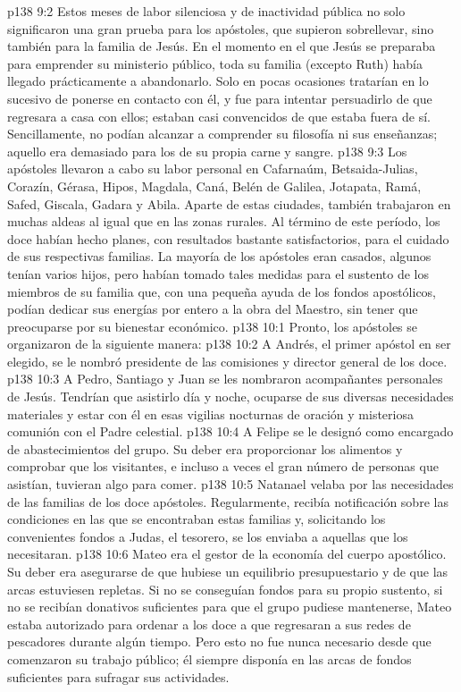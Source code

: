 \vs p138 9:2 Estos meses de labor silenciosa y de inactividad pública no solo significaron una gran prueba para los apóstoles, que supieron sobrellevar, sino también para la familia de Jesús. En el momento en el que Jesús se preparaba para emprender su ministerio público, toda su familia (excepto Ruth) había llegado prácticamente a abandonarlo. Solo en pocas ocasiones tratarían en lo sucesivo de ponerse en contacto con él, y fue para intentar persuadirlo de que regresara a casa con ellos; estaban casi convencidos de que estaba fuera de sí. Sencillamente, no podían alcanzar a comprender su filosofía ni sus enseñanzas; aquello era demasiado para los de su propia carne y sangre.
\vs p138 9:3 \pc Los apóstoles llevaron a cabo su labor personal en Cafarnaúm, Betsaida\hyp{}Julias, Corazín, Gérasa, Hipos, Magdala, Caná, Belén de Galilea, Jotapata, Ramá, Safed, Giscala, Gadara y Abila. Aparte de estas ciudades, también trabajaron en muchas aldeas al igual que en las zonas rurales. Al término de este período, los doce habían hecho planes, con resultados bastante satisfactorios, para el cuidado de sus respectivas familias. La mayoría de los apóstoles eran casados, algunos tenían varios hijos, pero habían tomado tales medidas para el sustento de los miembros de su familia que, con una pequeña ayuda de los fondos apostólicos, podían dedicar sus energías por entero a la obra del Maestro, sin tener que preocuparse por su bienestar económico.
\vs p138 10:1 Pronto, los apóstoles se organizaron de la siguiente manera:
\vs p138 10:2 A Andrés, el primer apóstol en ser elegido, se le nombró presidente de las comisiones y director general de los doce.
\vs p138 10:3 A Pedro, Santiago y Juan se les nombraron acompañantes personales de Jesús. Tendrían que asistirlo día y noche, ocuparse de sus diversas necesidades materiales y estar con él en esas vigilias nocturnas de oración y misteriosa comunión con el Padre celestial.
\vs p138 10:4 A Felipe se le designó como encargado de abastecimientos del grupo. Su deber era proporcionar los alimentos y comprobar que los visitantes, e incluso a veces el gran número de personas que asistían, tuvieran algo para comer.
\vs p138 10:5 Natanael velaba por las necesidades de las familias de los doce apóstoles. Regularmente, recibía notificación sobre las condiciones en las que se encontraban estas familias y, solicitando los convenientes fondos a Judas, el tesorero, se los enviaba a aquellas que los necesitaran.
\vs p138 10:6 Mateo era el gestor de la economía del cuerpo apostólico. Su deber era asegurarse de que hubiese un equilibrio presupuestario y de que las arcas estuviesen repletas. Si no se conseguían fondos para su propio sustento, si no se recibían donativos suficientes para que el grupo pudiese mantenerse, Mateo estaba autorizado para ordenar a los doce a que regresaran a sus redes de pescadores durante algún tiempo. Pero esto no fue nunca necesario desde que comenzaron su trabajo público; él siempre disponía en las arcas de fondos suficientes para sufragar sus actividades.
